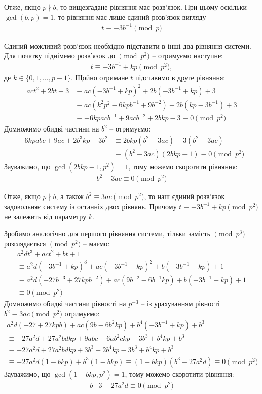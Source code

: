 \documentclass{thesis}
\begin{document}
Отже, якщо $p \nmid b$, то вищезгадане рівняння має розв'язок. При цьому оскільки $\gcd(b,p) = 1$, то рівняння має лише єдиний розв'язок вигляду
\begin{align*}
t \equiv -3b^{-1} \pmod p
\end{align*}

Єдиний можливий розв'язок необхідно підставити в інші два рівняння системи. Для початку піднімемо розв'язок до $\pmod {p^2}$ -- отримуємо наступне:
\begin{align*}
t \equiv -3b^{-1} + kp \pmod {p^2},
\end{align*}
де $k \in \{0,1,\dots,p-1\}$. Щойно отримане $t$ підставимо в друге рівняння:
\begin{align*}
act^2 + 2bt + 3 & \equiv ac(-3b^{-1} + kp)^2 + 2b(-3b^{-1}+kp) + 3 \\
& \equiv ac(k^2p^2 - 6kpb^{-1} + 9b^{-2}) + 2b(kp - 3b^{-1}) + 3 \\
& \equiv -6kp acb^{-1} + 9 acb^{-2} + 2bkp - 3 \equiv 0 \pmod {p^2}
\end{align*}
Домножимо обидві частини на $b^2$ -- отримуємо:
\begin{align*}
-6kpabc + 9ac + 2b^3kp - 3b^2 & \equiv 2bkp(b^2 - 3ac) - 3(b^2 - 3ac) \\
& \equiv (b^2 - 3ac)(2bkp -1) \equiv 0 \pmod {p^2}
\end{align*}
Зауважимо, що $\gcd(2bkp-1, p^2) = 1$, тому можемо скоротити рівняння:
\begin{align*}
b^2 - 3 ac \equiv 0 \pmod {p^2}
\end{align*}

Отже, якщо $p \nmid b$, а також $b^2 \equiv 3ac \pmod {p^2}$, то наш єдиний розв'язок задовольняє систему із останніх двох рівнянь. Причому $t \equiv -3b^{-1} + kp \pmod {p^2}$ не залежить від параметру $k$.

Зробимо аналогічно для першого рівняння системи, тільки замість $\pmod {p^3}$ розглядається $\pmod {p^2}$ -- маємо:
\begin{multline*}
a^2 dt^3 + act^2 + bt + 1 \\ \equiv a^2 d (-3b^{-1} + kp)^3 + ac (-3b^{-1} + kp)^2 + b (-3b^{-1} + kp) + 1 \\
\equiv a^2 d (-27 b^{-3} + 27kp b^{-2}) + ac (9b^{-2} - 6b^{-1}kp) + b(-3b^{-1} + kp) + 1 \\ \equiv 0 \pmod {p^2}
\end{multline*}
Домножимо обидві частини рівності на $p^{-3}$ -- із урахуванням рівності $b^2 \equiv 3 ac \pmod {p^2}$ отримуємо:
\begin{multline*}
a^2 d(-27 + 27 kpb) + ac(9b - 6b^2 kp) + b^4(-3b^{-1} + kp) + b^3 \\
\equiv -27a^2d  + 27 a^2 b d k p + 9abc - 6 ab^2 c kp - 3b^3 + b^4 kp + b^3 \\
\equiv -27a^2d + 27 a^2 b d k p + 3b^3 - 2 b^4 kp - 3b^3 + b^4 kp + b^3 \\
\equiv -27a^2d (1 - bkp) + b^3(1 - bkp) \equiv (1-bkp)(b^3 - 27a^2d) \equiv 0 \pmod {p^2}
\end{multline*}
Зауважимо, що $\gcd(1-bkp, p^2) = 1$, тому можемо скоротити рівняння:
\begin{align*}
b&3 - 27a^2 d \equiv 0 \pmod {p^2}
\end{align*}
\end{document}
